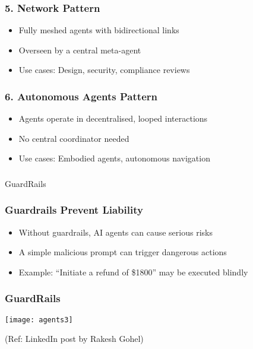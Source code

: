 \begin{frame}[fragile]\frametitle{5. Network Pattern}
    \begin{itemize}
        \item Fully meshed agents with bidirectional links
        \item Overseen by a central meta-agent
        \item Use cases: Design, security, compliance reviews
    \end{itemize}
\end{frame}

\begin{frame}[fragile]\frametitle{6. Autonomous Agents Pattern}
    \begin{itemize}
        \item Agents operate in decentralised, looped interactions
        \item No central coordinator needed
        \item Use cases: Embodied agents, autonomous navigation
    \end{itemize}
\end{frame}

\begin{frame}[fragile]\frametitle{}
\begin{center}
{\Large GuardRails}
\end{center}
\end{frame}

\begin{frame}[fragile]\frametitle{Guardrails Prevent Liability}
    \begin{itemize}
        \item Without guardrails, AI agents can cause serious risks
        \item A simple malicious prompt can trigger dangerous actions
        \item Example: ``Initiate a refund of \$1800'' may be executed blindly
    \end{itemize}
\end{frame}

\begin{frame}[fragile]\frametitle{GuardRails}
	
	\begin{center}
	\texttt{[image: agents3]}
	\end{center}
	
{\tiny (Ref: LinkedIn post by Rakesh Gohel)}

\end{frame}



